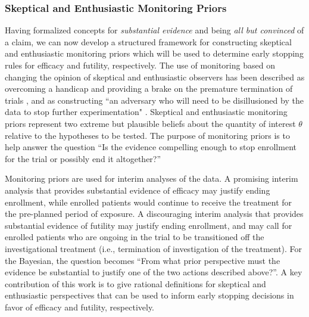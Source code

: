 \documentclass[useAMS,usenatbib,referee]{biom}
\begin{document}
\subsubsection{Skeptical and Enthusiastic Monitoring Priors}\label{sec:MP}
Having formalized concepts for \textit{substantial evidence} and  being \textit{all but convinced} of a claim, 
we can now develop a structured framework for constructing skeptical and enthusiastic monitoring priors which will be used to 
determine early stopping rules for efficacy and futility, respectively.
%
The use of monitoring based on changing the opinion of skeptical and enthusiastic observers has been described as overcoming a 
handicap \citep{Freedman1989} and providing a brake on the premature termination of trials \citep{Fayers1997}, and as 
constructing ``an adversary who will need to be disillusioned by the data to stop further experimentation" \citep{Spiegelhalter1994}. 
%
Skeptical and enthusiastic monitoring priors represent two extreme but plausible beliefs about the quantity of interest $\theta$ relative to the hypotheses to be tested.
%
The purpose of monitoring priors is to help answer the question ``Is the evidence compelling enough to stop enrollment for the trial or possibly end it altogether?''

Monitoring priors are used for interim analyses of the data. 
A promising interim analysis that provides substantial evidence of efficacy may justify ending enrollment, while enrolled patients would continue 
to receive the treatment for the pre-planned period of exposure. 
%
A discouraging interim analysis that provides substantial evidence of futility may justify ending enrollment, and may call for enrolled patients 
who are ongoing in the trial to be transitioned off the investigational treatment (i.e., termination of investigation of the treatment). 
%
For the Bayesian, the question becomes ``From what prior perspective must the evidence be substantial to justify one of the two actions described above?''.
%
A key contribution of this work is to give rational definitions for skeptical and enthusiastic perspectives that can be used 
to inform early stopping decisions in favor of efficacy and futility, respectively.
\end{document}
